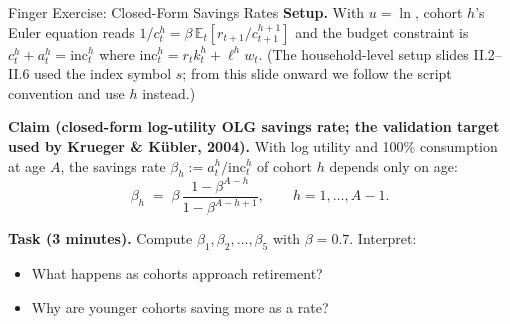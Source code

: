 \documentclass[aspectratio=169,11pt]{beamer}
\newcommand{\emphc}[1]{\textcolor{harvardcrimson}{#1}}
\begin{document}
\begin{frame}{\emphc{Finger Exercise:} Closed-Form Savings Rates}
\small
\textbf{Setup.}  With $u = \ln$, cohort $h$'s Euler equation reads $1/c_t^h = \beta\,\mathbb{E}_t[r_{t+1}/c_{t+1}^{h+1}]$ and the budget constraint is $c_t^h + a_t^h = \text{inc}_t^h$ where $\text{inc}_t^h = r_t k_t^h + \ell^h w_t$.  (The household-level setup slides II.2--II.6 used the index symbol $s$; from this slide onward we follow the script convention and use $h$ instead.)

\vspace{0.4em}
\textbf{Claim (closed-form log-utility OLG savings rate; the validation target used by Krueger \& K\"ubler, 2004).}  With log utility and 100\% consumption at age $A$, the savings rate $\beta_h := a_t^h/\text{inc}_t^h$ of cohort $h$ depends only on age:
\[
\beta_h \;=\; \beta\,\frac{1 - \beta^{A-h}}{1 - \beta^{A-h+1}}, \qquad h = 1, \ldots, A-1.
\]

\vspace{0.4em}
\textbf{Task (3 minutes).}  Compute $\beta_1, \beta_2, \ldots, \beta_5$ with $\beta = 0.7$.  Interpret:
\begin{itemize}
\item What happens as cohorts approach retirement?
\item Why are younger cohorts saving more as a \emphc{rate}?
\end{itemize}
\end{frame}
\end{document}
